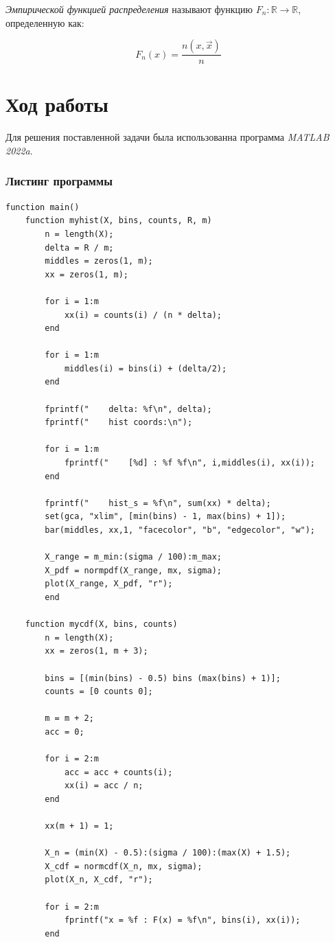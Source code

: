 \documentclass[12pt]{report}
\begin{document}
\textit{Эмпирической функцией распределения} называют функцию $F_n: \mathbb{R} \to \mathbb{R}$, определенную как: 

\begin{equation}
	F_n(x) = \frac{n(x, \vec x)}{n}
\end{equation}

\chapter*{Ход работы}
Для решения поставленной задачи была использованна программа \textit{MATLAB 2022a}.

\subsection*{Листинг программы}
\begin{lstlisting}
function main()
	function myhist(X, bins, counts, R, m)
		n = length(X);
		delta = R / m;
		middles = zeros(1, m);
		xx = zeros(1, m);
		
		for i = 1:m
			xx(i) = counts(i) / (n * delta);
		end
		
		for i = 1:m
			middles(i) = bins(i) + (delta/2);
		end
		
		fprintf("    delta: %f\n", delta);
		fprintf("    hist coords:\n");
		
		for i = 1:m
			fprintf("    [%d] : %f %f\n", i,middles(i), xx(i));
		end
		
		fprintf("    hist_s = %f\n", sum(xx) * delta);
		set(gca, "xlim", [min(bins) - 1, max(bins) + 1]);
		bar(middles, xx,1, "facecolor", "b", "edgecolor", "w");
		
		X_range = m_min:(sigma / 100):m_max;
		X_pdf = normpdf(X_range, mx, sigma);
		plot(X_range, X_pdf, "r");
		end

	function mycdf(X, bins, counts)
		n = length(X);
		xx = zeros(1, m + 3);
		
		bins = [(min(bins) - 0.5) bins (max(bins) + 1)];
		counts = [0 counts 0];
		
		m = m + 2;
		acc = 0;
		
		for i = 2:m
			acc = acc + counts(i);
			xx(i) = acc / n;
		end
		
		xx(m + 1) = 1;
		
		X_n = (min(X) - 0.5):(sigma / 100):(max(X) + 1.5);
		X_cdf = normcdf(X_n, mx, sigma);
		plot(X_n, X_cdf, "r");
		
		for i = 2:m
			fprintf("x = %f : F(x) = %f\n", bins(i), xx(i));
		end
		

\end{lstlisting}
\end{document}
